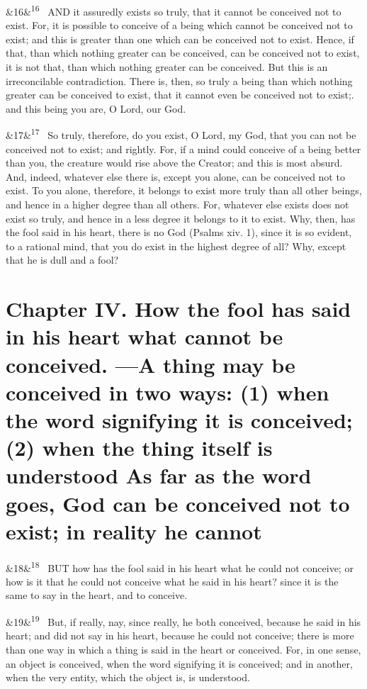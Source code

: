 \documentclass[12pt]{article}
\newcommand{\para}[1][]{\par\noindent\ifx&#1&\else\textsuperscript{\footnotesize #1}~\fi}
\begin{document}
\para[16] AND it assuredly exists so truly, that it cannot be conceived not to exist. For, it is possible to conceive of a being which cannot be conceived not to exist; and this is greater than one which can be conceived not to exist. Hence, if that, than which nothing greater can be conceived, can be conceived not to exist, it is not that, than which nothing greater can be conceived. But this is an irreconcilable contradiction. There is, then, so truly a being than which nothing greater can be conceived to exist, that it cannot even be conceived not to exist;. and this being you are, O Lord, our God.

\para[17] So truly, therefore, do you exist, O Lord, my God, that you can not be conceived not to exist; and rightly. For, if a mind could conceive of a being better than you, the creature would rise above the Creator; and this is most absurd. And, indeed, whatever else there is, except you alone, can be conceived not to exist. To you alone, therefore, it belongs to exist more truly than all other beings, and hence in a higher degree than all others. For, whatever else exists does not exist so truly, and hence in a less degree it belongs to it to exist. Why, then, has the fool said in his heart, there is no God (Psalms xiv. 1), since it is so evident, to a rational mind, that you do exist in the highest degree of all? Why, except that he is dull and a fool?


\section*{Chapter IV. How the fool has said in his heart what cannot be conceived. ---A thing may be conceived in two ways: (1) when the word signifying it is conceived; (2) when the thing itself is understood As far as the word goes, God can be conceived not to exist; in reality he cannot}

\para[18] BUT how has the fool said in his heart what he could not conceive; or how is it that he could not conceive what he said in his heart? since it is the same to say in the heart, and to conceive.

\para[19] But, if really, nay, since really, he both conceived, because he said in his heart; and did not say in his heart, because he could not conceive; there is more than one way in which a thing is said in the heart or conceived. For, in one sense, an object is conceived, when the word signifying it is conceived; and in another, when the very entity, which the object is, is understood.
\end{document}
